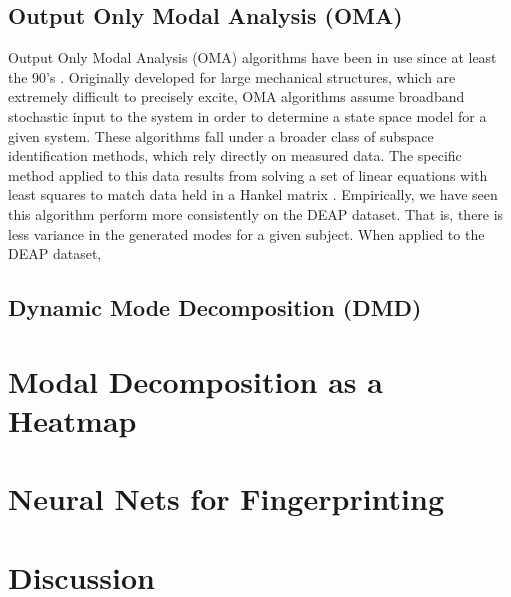 \documentclass[12pt, a4paper]{article}
\newcommand{\+}[1]{\ensuremath{\mathbf{#1}}} %
\begin{document}
\subsection{Output Only Modal Analysis (OMA)}
Output Only Modal Analysis (OMA) algorithms have been in use since at least the 90's \cite{peeters1999reference}. Originally developed for large mechanical structures, which are extremely difficult to precisely excite, OMA algorithms assume broadband stochastic input to the system in order to determine a state space model for a given system. These algorithms fall under a broader class of subspace identification methods, which rely directly on measured data. The specific method applied to this data results from solving a set of linear equations with least squares to match data held in a Hankel matrix \cite{261604}. Empirically, we have seen this algorithm perform more consistently on the DEAP dataset. That is, there is less variance in the generated modes for a given subject. When applied to the DEAP dataset, 


\subsection{Dynamic Mode Decomposition (DMD)}

\section{Modal Decomposition as a Heatmap}

\section{Neural Nets for Fingerprinting}

\section{Discussion}

\pagebreak


\end{document}
